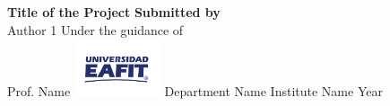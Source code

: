\documentclass{article}
\begin{document}
	\begin{titlepage}
		\begin{center}
			\huge
			\textbf{Title of the Project}
			\vfill
			\Large
			\textbf{Submitted by} \\
			\medskip
			Author 1
			\vfill
			Under the guidance of \\
			\medskip
			Prof. Name
			\vfill
			\includegraphics[width=1in]{logo-eafit.png}
			\vfill
			Department Name
			\vfill
			Institute Name
			\vfill
			Year
		\end{center}
	\end{titlepage}
	
	
	
	\lipsum[1-10	]
	
\end{document}
